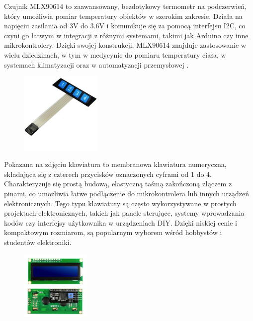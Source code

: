     Czujnik MLX90614 to zaawansowany, bezdotykowy termometr na podczerwień, który umożliwia pomiar temperatury obiektów w szerokim zakresie. Działa na napięciu zasilania od 3V do 3.6V i komunikuje się za pomocą interfejsu I2C, co czyni go łatwym w integracji z różnymi systemami, takimi jak Arduino czy inne mikrokontrolery. Dzięki swojej konstrukcji, MLX90614 znajduje zastosowanie w wielu dziedzinach, w tym w medycynie do pomiaru temperatury ciała, w systemach klimatyzacji oraz w automatyzacji przemysłowej \cite{5}.


    \begin{figure}[h!]
        \centering
        \includegraphics[width=0.35\textwidth]{images/keyboard4pin.jpg}
        \label{fig:example}
    \end{figure}

    Pokazana na zdjęciu klawiatura to membranowa klawiatura numeryczna, składająca się z czterech przycisków oznaczonych cyframi od 1 do 4. Charakteryzuje się prostą budową, elastyczną taśmą zakończoną złączem z pinami, co umożliwia łatwe podłączenie do mikrokontrolera lub innych urządzeń elektronicznych. Tego typu klawiatury są często wykorzystywane w prostych projektach elektronicznych, takich jak panele sterujące, systemy wprowadzania kodów czy interfejsy użytkownika w urządzeniach DIY. Dzięki niskiej cenie i kompaktowym rozmiarom, są popularnym wyborem wśród hobbystów i studentów elektroniki.


    \begin{figure}[h!]
        \centering
        \includegraphics[width=0.3\textwidth]{images/lcd.png}
        \label{fig:example}
    \end{figure}
    
